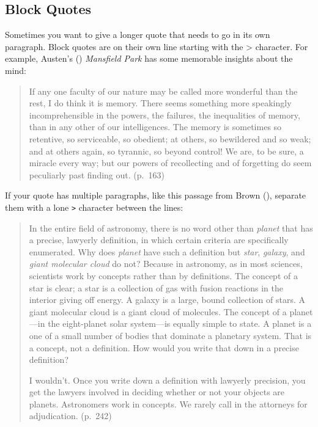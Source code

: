 \documentclass[
  jou,
  floatsintext,
  longtable,
  nolmodern,
  notxfonts,
  notimes,
  colorlinks=true,linkcolor=blue,citecolor=blue,urlcolor=blue]{apa7}
\begin{document}
\subsection{Block Quotes}\label{block-quotes}

Sometimes you want to give a longer quote that needs to go in its own
paragraph. Block quotes are on their own line starting with the
\textgreater{} character. For example, Austen's
() \emph{Mansfield
Park} has some memorable insights about the mind:

\begin{quote}
If any one faculty of our nature may be called more wonderful than the
rest, I do think it is memory. There seems something more speakingly
incomprehensible in the powers, the failures, the inequalities of
memory, than in any other of our intelligences. The memory is sometimes
so retentive, so serviceable, so obedient; at others, so bewildered and
so weak; and at others again, so tyrannic, so beyond control! We are, to
be sure, a miracle every way; but our powers of recollecting and of
forgetting do seem peculiarly past finding out. (p.~163)
\end{quote}

If your quote has multiple paragraphs, like this passage from Brown
(), separate them with a
lone \texttt{\textgreater{}} character between the lines:

\begin{quote}
In the entire field of astronomy, there is no word other than
\emph{planet} that has a precise, lawyerly definition, in which certain
criteria are specifically enumerated. Why does \emph{planet} have such a
definition but \emph{star}, \emph{galaxy}, and \emph{giant molecular
cloud} do not? Because in astronomy, as in most sciences, scientists
work by concepts rather than by definitions. The concept of a star is
clear; a star is a collection of gas with fusion reactions in the
interior giving off energy. A galaxy is a large, bound collection of
stars. A giant molecular cloud is a giant cloud of molecules. The
concept of a planet---in the eight-planet solar system---is equally
simple to state. A planet is a one of a small number of bodies that
dominate a planetary system. That is a concept, not a definition. How
would you write that down in a precise definition?

I wouldn't. Once you write down a definition with lawyerly precision,
you get the lawyers involved in deciding whether or not your objects are
planets. Astronomers work in concepts. We rarely call in the attorneys
for adjudication. (p.~242)
\end{quote}
\end{document}
